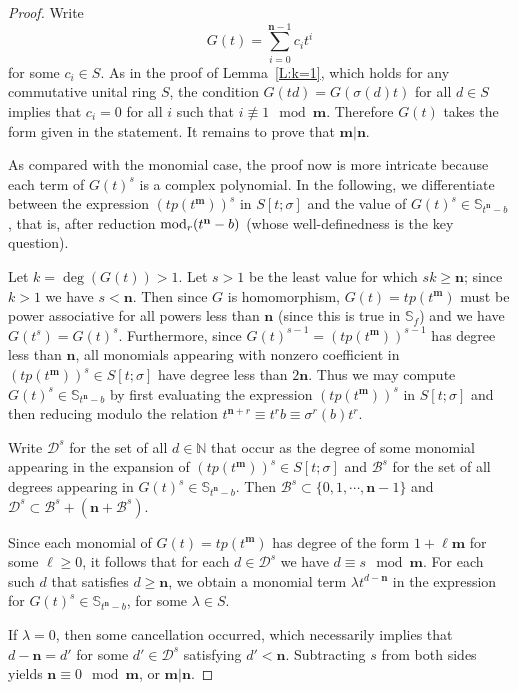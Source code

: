 \documentclass[11pt]{amsart}
\theoremstyle{plain}
\theoremstyle{definition}
\numberwithin{equation}{section}
\numberwithin{figure}{section}
\newcommand{\Sf}{\Stsigma/\Stsigma f(t)} %
\newcommand{\Sone}[1]{\Stsigma/\Stsigma (t^{\de}-#1)} %
\newcommand{\ring}{S}
\newcommand{\Stsigma}{S[t;\sigma]}
\newcommand{\os}{\mathbf{m}}  %
\newcommand{\de}{\mathbf{n}}  %
\begin{document}
\begin{proof}
    Write
    $$
    G(t) = \sum_{i=0}^{\de-1}c_i t^i
    $$
    for some $c_i\in \ring$.
    As in the proof of Lemma~\ref{L:k=1}, which holds for any commutative unital ring $S$, the condition $G(td)=G(\sigma(d)t)$ for all $d\in \ring$ implies that $c_i=0$ for all $i$ such that $i\not\equiv 1 \mod \os$. Therefore $G(t)$ takes the form given in the statement.  It remains to prove that $\os|\de$.

    As compared with the monomial case, the proof now is more intricate because each term of $G(t)^s$ is a complex polynomial.
    In the following, we differentiate between the expression $(tp(t^{\os}))^s$ in $\Stsigma$ and the value of $G(t)^s\in \mathbb{S}_{t^\de-b} %
    $, that is, after reduction ${\rm mod}_r(t^{\de}-b)$ (whose well-definedness is the key question).

    Let $k=\deg(G(t))>1$.  Let $s>1$ be the least value for which $sk\geq \de$; since $k>1$ we have $s<\de$. Then since $G$ is homomorphism, $G(t)=tp(t^{\os})$ must be power associative for all powers less than $\de$ (since this is true in $\mathbb{S}_{f}$) %
    and we have $G(t^s)=G(t)^s$.  Furthermore, since $G(t)^{s-1}=(tp(t^{\os}))^{s-1}$ has degree less than $\de$, all monomials appearing with nonzero coefficient in $(tp(t^{\os}))^s\in \Stsigma$ have degree less than $2\de$.  Thus we may compute $G(t)^s\in \mathbb{S}_{t^\de-b} %
    $ by first evaluating the expression $(tp(t^{\os}))^s$ in $\Stsigma$ and then reducing modulo the relation $t^{\de+r}\equiv t^rb\equiv \sigma^r(b)t^r$.

    Write $\mathcal{D}^s$ for the set of all $d\in \mathbb{N}$ that occur as the degree of some monomial appearing in the expansion of $(tp(t^{\os}))^s\in \Stsigma$ and $\mathcal{B}^s$ for the set of all degrees appearing in $G(t)^s\in \mathbb{S}_{t^\de-b} %
    $. Then $\mathcal{B}^s \subset \{0,1,\cdots,\de-1\}$ and $\mathcal{D}^s\subset \mathcal{B}^s + (\de+\mathcal{B}^s)$.

    Since each monomial of $G(t)=tp(t^{\os})$ has degree of the form $1+\ell \os$ for some $\ell\geq 0$, it follows that for each $d\in \mathcal{D}^s$ we have  $d\equiv s\mod \os$.
    For each such $d$ that satisfies $d\geq \de$, we obtain a monomial term $\lambda t^{d-\de}$ in the expression for $G(t)^s\in \mathbb{S}_{t^\de-b} $, for some $\lambda \in \ring$.

    If $\lambda = 0$, then some cancellation occurred, which necessarily implies that $d-\de=d'$ for some $d'\in \mathcal{D}^s$ satisfying $d'<\de$.  Subtracting $s$ from both sides yields $\de\equiv 0 \mod \os$, or $\os|\de$.


\end{proof}
\end{document}
